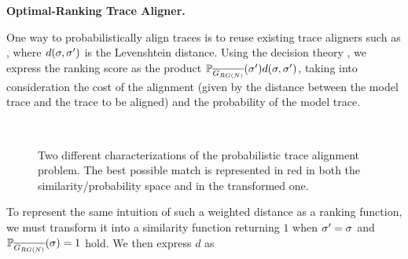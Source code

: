 		

\vspace{+0.2cm}
\noindent
\textbf{Optimal-Ranking Trace Aligner.}\label{subsec:eta}
{One way to probabilistically align traces is to reuse existing trace aligners such as \cite{DBLP:conf/edoc/AdriansyahDA11,LeoniM17}, where $d(\sigma,{\sigma'})$ is the Levenshtein distance.
Using the decision theory \cite{dectheor}, we express the ranking score as the product $\mathbb{P}_{\overline{G_{RG(N)}}}({\sigma'}) d(\sigma,{\sigma'})$, taking into consideration the cost of the alignment (given by the distance between the model trace and the trace to be aligned) and the probability of the model trace.

\begin{figure}[!t]
	\centering
	\qquad
	\\
	\caption{Two different characterizations of the probabilistic trace alignment problem. The best possible match is represented in red in both the similarity/probability space and in the transformed one.}
\end{figure}
To represent the same intuition of such a weighted distance as a ranking function, we must transform it into a
similarity function returning $1$ when ${\sigma'}=\sigma$ and $\mathbb{P}_{\overline{G_{RG(N)}}}(\sigma)=1$ hold. We then express $d$ as}
